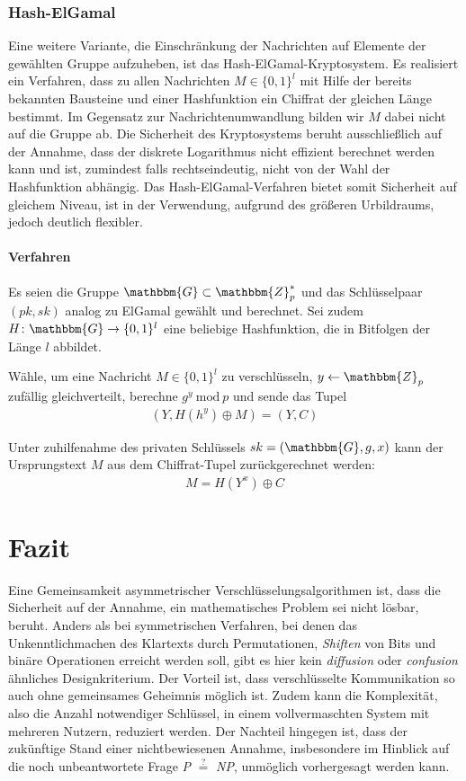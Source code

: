 \subsubsection{Hash-ElGamal}
Eine weitere Variante, die Einschränkung der Nachrichten auf Elemente der gewählten Gruppe aufzuheben, ist das Hash-ElGamal-Kryptosystem. Es realisiert ein Verfahren, dass zu allen Nachrichten $M \in \{0, 1\}^l$ mit Hilfe der bereits bekannten Bausteine und einer Hashfunktion ein Chiffrat der gleichen Länge bestimmt. Im Gegensatz zur Nachrichtenumwandlung bilden wir $M$ dabei nicht auf die Gruppe ab. Die Sicherheit des Kryptosystems beruht ausschließlich auf der Annahme, dass der diskrete Logarithmus nicht effizient berechnet werden kann und ist, zumindest falls rechtseindeutig, nicht von der Wahl der Hashfunktion abhängig. Das Hash-ElGamal-Verfahren bietet somit Sicherheit auf gleichem Niveau, ist in der Verwendung, aufgrund des größeren Urbildraums, jedoch deutlich flexibler.

\paragraph*{Verfahren}
Es seien die Gruppe $\mathbbm{G} \subset \mathbbm{Z}^*_p$ und das Schlüsselpaar $(pk,sk)$ analog zu ElGamal gewählt und berechnet. Sei zudem $H \colon \mathbbm{G} \rightarrow \{0,1\}^l$ eine beliebige Hashfunktion, die in Bitfolgen der Länge $l$ abbildet.

Wähle, um eine Nachricht $M \in \{0,1\}^l$ zu verschlüsseln, $y \leftarrow \mathbbm{Z}_p$ zufällig gleichverteilt, berechne $g^y\ \text{mod}\ p$ und sende das Tupel
\begin{align*}
(Y, H(h^y) \oplus M) = (Y, C)
\end{align*}

Unter zuhilfenahme des privaten Schlüssels $sk = (\mathbbm{G}, g, x)$ kann der Ursprungstext $M$ aus dem Chiffrat-Tupel zurückgerechnet werden:
\begin{align*}
M = H(Y^x) \oplus C
\end{align*}

\section{Fazit}
Eine Gemeinsamkeit asymmetrischer Verschlüsselungsalgorithmen ist, dass die Sicherheit auf der Annahme, ein mathematisches Problem sei nicht  lösbar, beruht. Anders als bei symmetrischen Verfahren, bei denen das Unkenntlichmachen des Klartexts durch Permutationen, \textit{Shiften} von Bits und binäre Operationen erreicht werden soll, gibt es hier kein \textit{diffusion} oder \textit{confusion} ähnliches Designkriterium. Der Vorteil ist, dass verschlüsselte Kommunikation so auch ohne gemeinsames Geheimnis möglich ist. Zudem kann die Komplexität, also die Anzahl notwendiger Schlüssel, in einem vollvermaschten System mit mehreren Nutzern, reduziert werden. Der Nachteil hingegen ist, dass der zukünftige Stand einer nichtbewiesenen Annahme, insbesondere im Hinblick auf die noch unbeantwortete Frage \textit{P} $\stackrel{?}{=}$ \textit{NP}, unmöglich vorhergesagt werden kann.

